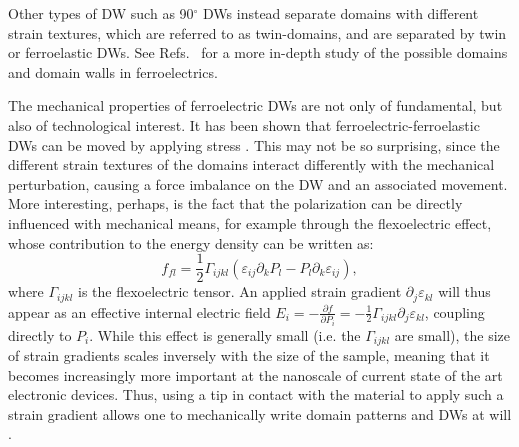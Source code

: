 Other types of DW such as 90$^\circ$ DWs instead separate domains with different strain textures, which are referred to as twin-domains, and are separated by twin or ferroelastic DWs.
See Refs.~\cite{Cao1991,Hu1998,Marton2010} for a more in-depth study of the possible domains and domain walls in ferroelectrics.

The mechanical properties of ferroelectric DWs are not only of fundamental, but also of technological interest.
It has been shown that ferroelectric-ferroelastic DWs can be moved by applying stress \cite{Schneider2001}.
This may not be so surprising, since the different strain textures of the domains interact differently with the mechanical perturbation, causing a force imbalance on the DW and an associated movement.
More interesting, perhaps, is the fact that the polarization can be directly influenced with mechanical means, for example through the flexoelectric effect, whose contribution to the energy density can be written as:
\begin{equation}
	\label{eq:BTO_flexoelectricity}
	f_{fl} = \frac{1}{2}\Gamma_{ijkl}(\varepsilon_{ij}\partial_kP_l-P_l\partial_k\varepsilon_{ij}),
\end{equation}
where $\Gamma_{ijkl}$ is the flexoelectric tensor.
An applied strain gradient $\partial_j\varepsilon_{kl}$ will thus appear as an effective internal electric field $E_{i} = -\frac{\partial f}{\partial P_i} = -\frac{1}{2}\Gamma_{ijkl}\partial_j\varepsilon_{kl}$, coupling directly to $P_i$.
While this effect is generally small (i.e. the $\Gamma_{ijkl}$ are small), the size of strain gradients scales inversely with the size of the sample, meaning that it becomes increasingly more important at the nanoscale of current state of the art electronic devices.
Thus, using a tip in contact with the material to apply such a strain gradient allows one to mechanically write domain patterns and DWs at will \cite{Lu2012,Abdollahi2015, Cordero-Edwards2017,Cordero-Edwards2019}.

